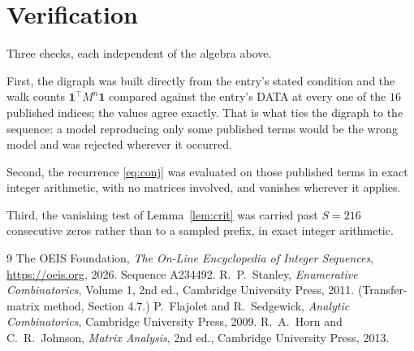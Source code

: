 \documentclass[11pt,a4paper]{article}
\theoremstyle{plain}
\theoremstyle{definition}
\begin{document}
\section{Verification}

Three checks, each independent of the algebra above.

First, the digraph was built directly from the entry's stated condition and the walk counts
$\mathbf{1}^{\!\top}M^{n}\mathbf{1}$ compared against the entry's DATA at every one of
the $16$ published indices; the values agree exactly. That is what ties the digraph to
the sequence: a model reproducing only some published terms would be the wrong model and
was rejected wherever it occurred.

Second, the recurrence \eqref{eq:conj} was evaluated on those published terms in exact
integer arithmetic, with no matrices involved, and vanishes wherever it applies.

Third, the vanishing test of Lemma~\ref{lem:crit} was carried past $S=216$ consecutive
zeros rather than to a sampled prefix, in exact integer arithmetic.

\begin{thebibliography}{9}
 The OEIS Foundation, \emph{The On-Line Encyclopedia of Integer
Sequences}, \url{https://oeis.org}, 2026. Sequence A234492.
 R.~P.~Stanley, \emph{Enumerative Combinatorics}, Volume 1, 2nd ed.,
Cambridge University Press, 2011. (Transfer-matrix method, Section 4.7.)
 P.~Flajolet and R.~Sedgewick, \emph{Analytic Combinatorics}, Cambridge
University Press, 2009.
 R.~A.~Horn and C.~R.~Johnson, \emph{Matrix Analysis}, 2nd ed., Cambridge
University Press, 2013.
\end{thebibliography}
\end{document}
